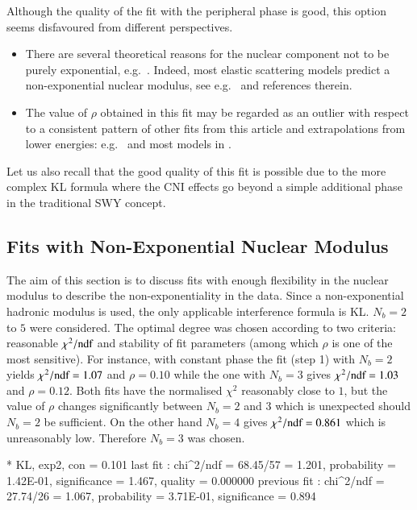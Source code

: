 Although the quality of the fit with the peripheral phase is good, this option seems disfavoured from different perspectives.
\begin{itemize}
\item There are several theoretical reasons for the nuclear component not to be purely exponential, e.g.~\cite{kmr00-multiPom,kmr12-opacity,kmr15-slope,fagundes15}. Indeed, most elastic scattering models predict a non-exponential nuclear modulus, see e.g.~\cite{elegent} and references therein.
\item The value of $\rho$ obtained in this fit may be regarded as an outlier with respect to a consistent pattern of other fits from this article and extrapolations from lower energies: e.g.~\cite{fagundes12,block12,compete} and most models in \cite{elegent}.
\end{itemize}
Let us also recall that the good quality of this fit is possible due to the more complex KL formula where the CNI effects go beyond a simple additional phase in the traditional SWY concept.


\subsection{Fits with Non-Exponential Nuclear Modulus}
\label{sec:fit exp3}

The aim of this section is to discuss fits with enough flexibility in the nuclear modulus to describe the non-exponentiality in the data. Since a non-exponential hadronic modulus is used, the only applicable interference formula is KL. $N_b=2$ to $5$ were considered. The optimal degree was chosen according to two criteria: reasonable $\chi^2/\hbox{ndf}$ and stability of fit parameters (among which $\rho$ is one of the most sensitive). For instance, with constant phase the fit (step 1) with $N_b=2$ yields $\chi^2/\hbox{ndf} = 1.07$ and $\rho = 0.10$ while the one with $N_b=3$ gives $\chi^2/\hbox{ndf} = 1.03$ and $\rho = 0.12$. Both fits have the normalised $\chi^2$ reasonably close to $1$, but the value of $\rho$ changes significantly between $N_b=2$ and $3$ which is unexpected should $N_b=2$ be sufficient. On the other hand $N_b=4$ gives $\chi^2/\hbox{ndf} = 0.861$ which is unreasonably low. Therefore $N_b=3$ was chosen.

\iffalse
* KL, exp2, con
\rh       =   0.101 
last fit     : chi^2/ndf = 68.45/57 = 1.201, probability = 1.42E-01, significance = 1.467, quality = 0.000000
previous fit : chi^2/ndf = 27.74/26 = 1.067, probability = 3.71E-01, significance = 0.894

